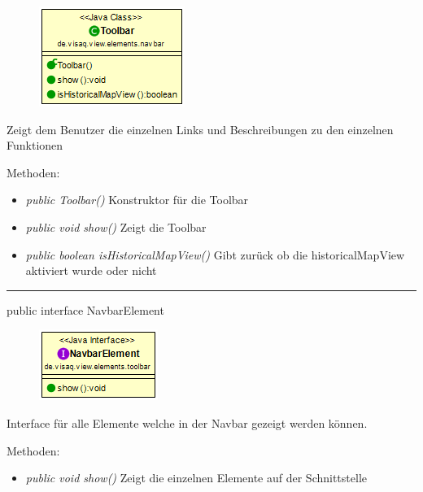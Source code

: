 \begin{minipage}{0.3\textwidth}
    \begin{figure}[H]
        \includegraphics[scale = 0.6]{media/frontend/view/de.view.elements.navbar/ToolbarClass.png}
    \end{figure}
    \end{minipage} \hfill
    \begin{minipage}{0.6\textwidth}
Zeigt dem Benutzer die einzelnen Links und Beschreibungen zu den einzelnen Funktionen
\end{minipage}

Methoden:
\begin{itemize}
    \item \emph{public Toolbar()} Konstruktor für die Toolbar
    \item \emph{public void show()} Zeigt die Toolbar
    \item \emph{public boolean isHistoricalMapView()} Gibt zurück ob die historicalMapView aktiviert wurde oder nicht
\end{itemize}

\rule{\textwidth}{0.4pt}
public interface NavbarElement

\begin{minipage}{0.3\textwidth}
    \begin{figure}[H]
        \includegraphics[scale = 0.7]{media/frontend/view/de.view.elements.navbar/NavbarElementClass.png}
    \end{figure}
\end{minipage} \hfill
\begin{minipage}{0.6\textwidth}
Interface für alle Elemente welche in der Navbar gezeigt werden können.
\end{minipage}

Methoden:
\begin{itemize}
    \item \emph{public void show()} Zeigt die einzelnen Elemente auf der Schnittstelle
\end{itemize}
